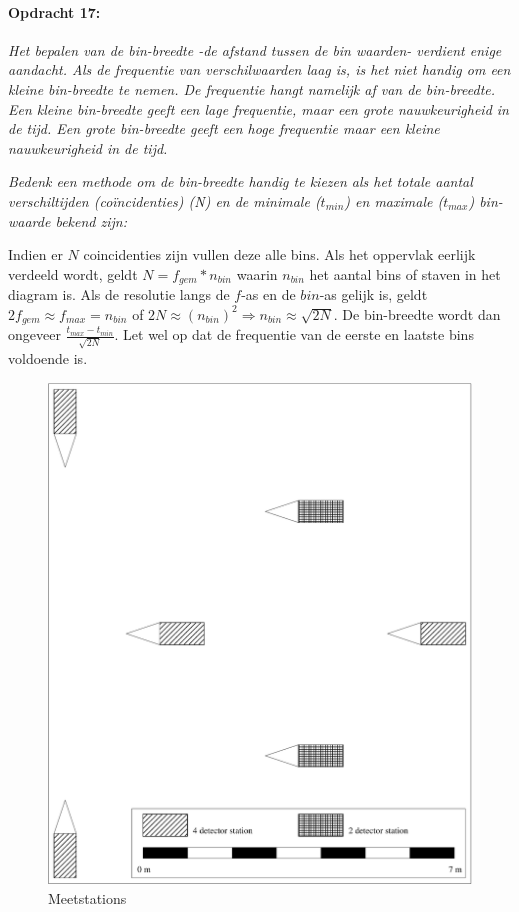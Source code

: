 \bigskip{}
\begin{minipage}[t]{1\columnwidth}%

\paragraph{Opdracht 17:}

\textit{Het bepalen van de bin-breedte -de afstand tussen de bin waarden-
verdient enige aandacht. Als de frequentie van verschilwaarden laag
is, is het niet handig om een kleine bin-breedte te nemen. De frequentie
hangt namelijk af van de bin-breedte. Een kleine bin-breedte geeft
een lage frequentie, maar een grote nauwkeurigheid in de tijd. Een
grote bin-breedte geeft een hoge frequentie maar een kleine nauwkeurigheid
in de tijd.}

\textit{Bedenk een methode om de bin-breedte handig te kiezen als
het totale aantal verschiltijden (coïncidenties) (N) en de minimale
($t_{min}$) en maximale ($t_{max}$) bin-waarde bekend zijn:}

Indien er $N$ coincidenties zijn vullen deze alle bins. Als het oppervlak
eerlijk verdeeld wordt, geldt $N=f_{gem}*n_{bin}$ waarin $n_{bin}$
het aantal bins of staven in het diagram is. Als de resolutie langs
de $f$-as en de $bin$-as gelijk is, geldt $2f_{gem}\approx f_{max}=n_{bin}$
of $2N\approx\left(n_{bin}\right)^{2}\Rightarrow n_{bin}\approx\sqrt{2N}$.
De bin-breedte wordt dan ongeveer $\frac{t_{max}-t_{min}}{\sqrt{2N}}$.
Let wel op dat de frequentie van de eerste en laatste bins voldoende
is. %
\end{minipage}

\bigskip{}

\begin{figure}[p]
    \centering
    \includegraphics[width=15.833cm]{Figures/station}
    \caption{\label{fig:Meetstations}Meetstations}
\end{figure}


